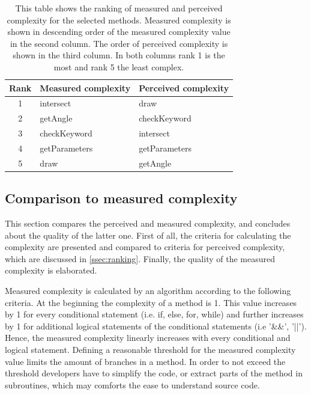 \documentclass[conference]{IEEEtran}
\begin{document}
\begin{table}
\centering
	\begin{tabular}{c | l l}
		Rank 	& Measured complexity   & Perceived complexity      \\ \hline 
		1 		& intersect	            & draw                      \\ 
		2 		& getAngle       	    & checkKeyword              \\ 
		3 		& checkKeyword  	    & intersect                 \\ 
		4 		& getParameters         & getParameters             \\ 
		5 		& draw 		            & getAngle                  \\ 
	\end{tabular} 
\caption[Measured and perceived complexity ranking]{This table shows the ranking of measured and perceived complexity for the selected methods. Measured complexity is shown in descending order of the measured complexity value in the second column. The order of perceived complexity is shown in the third column. In both columns rank 1 is the most and rank 5 the least complex.}
\label{tbl:ranking}
\end{table}

\subsection{Comparison to measured complexity}
\label{ssec:comparison}
This section compares the perceived and measured complexity, and concludes about the quality of the latter one. First of all, the criteria for calculating the complexity are presented and compared to criteria for perceived complexity, which are discussed in \cref{ssec:ranking}. Finally, the quality of the measured complexity is elaborated.

Measured complexity is calculated by an algorithm according to the following criteria. At the beginning the complexity of a method is 1. This value increases by 1 for every conditional statement (i.e. if, else, for, while) and further increases by 1 for additional logical statements of the conditional statements (i.e '\&\&', '||'). Hence, the measured complexity linearly increases with every conditional and logical statement. Defining a reasonable threshold for the measured complexity value limits the amount of branches in a method. In order to not exceed the threshold developers have to simplify the code, or extract parts of the method in subroutines, which may comforts the ease to understand source code.
\end{document}
